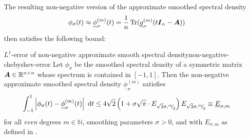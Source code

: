 The resulting non-negative version of the approximate smoothed spectral density 
\begin{equation}
    \phi_{\sigma}(t) \approx \underline{\phi}_{\sigma}^{(m)}(t) = \frac{1}{n} \operatorname{Tr}(\underline{g}_{\sigma}^{(m)}(t\boldsymbol{I}_n - \boldsymbol{A}))
    \label{equ:non-negative-expanded-density}
\end{equation}
then satisfies the following bound:

\begin{lemma}{$L^1$-error of non-negative approximate smooth spectral density}{non-negative-chebyshev-error}
Let $\phi_{\sigma}$ be the smoothed spectral density of a symmetric matrix $\boldsymbol{A} \in \mathbb{R}^{n \times n}$ whose spectrum is contained in $[-1, 1]$. Then the non-negative approximate smoothed spectral density $\underline{\phi}_{\sigma}^{(m)}$ satisfies
    \begin{equation}
        \int_{-1}^{1} \left| \phi_{\sigma}(t) - \underline{\phi}_{\sigma}^{(m)}(t) \right|~\mathrm{d}t \leq 4 \sqrt{2} \left(1 + \sigma \sqrt{\pi} \cdot E_{\sqrt{2}\sigma, {}^{m}{\mskip -5mu/\mskip -3mu}_{2}}\right) E_{\sqrt{2}\sigma, {}^{m}{\mskip -5mu/\mskip -3mu}_{2}} \equiv \underline{E}_{\sigma, m}
        \label{equ:chebyshev-interpolation-sup-error-kernel-nonneg}
    \end{equation}
    for all \emph{even} degrees $m \in \mathbb{N}$, smoothing parameters $\sigma > 0$, and with $E_{\sigma, m}$ as defined in .
\end{lemma}

